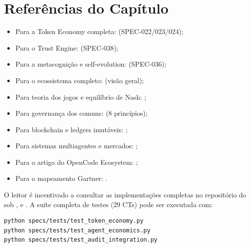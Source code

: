 \section*{Referências do Capítulo}

\begin{itemize}
\item Para a Token Economy completa:
\cite{opencode2026token} (SPEC-022/023/024);
\item Para o Trust Engine:
\cite{opencode2026spec038} (SPEC-038);
\item Para a metacognição e self-evolution:
\cite{opencode2026spec036} (SPEC-036);
\item Para o ecossistema completo:
\cite{opencode2026ecosystem} (visão geral);
\item Para teoria dos jogos e equilíbrio de Nash:
\cite{nash1950equilibrium, vonneumann1944theory};
\item Para governança dos comuns:
\cite{ostrom1990governing} (8 princípios);
\item Para blockchain e ledgers imutáveis:
\cite{nakamoto2008bitcoin, buterin2014next};
\item Para sistemas multiagentes e mercados:
\cite{wooldridge2009multiagent, shoham2023multiagent};
\item Para o artigo do OpenCode Ecosystem:
\cite{laranjeira2026opencode};
\item Para o mapeamento Gartner:
\cite{laranjeira2026gartner, gartner2026hype}.
\end{itemize}

\begin{observacao}
O leitor é incentivado a consultar as implementações completas
no repositório do \opencodeeco{} sob
,
 e
.
A suíte completa de testes (29 CTs) pode ser executada com:
\begin{lstlisting}[style=bashstyle]
python specs/tests/test_token_economy.py
python specs/tests/test_agent_economics.py
python specs/tests/test_audit_integration.py
\end{lstlisting}
\end{observacao}

